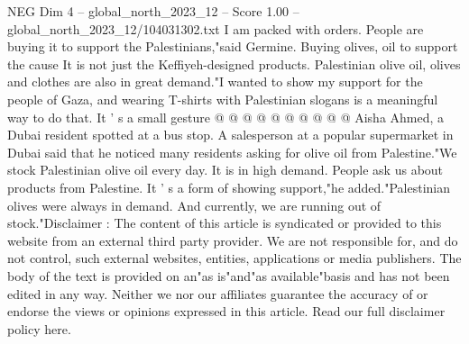 \begin{textsample}{NEG Dim 4 – global\_north\_2023\_12 – Score 1.00 – global\_north\_2023\_12/104031302.txt}
I am packed with orders.
People are buying it to support the Palestinians,"said Germine.
Buying olives, oil to support the cause It is not just the Keffiyeh-designed products.
Palestinian olive oil, olives and clothes are also in great demand."I wanted to show my support for the people of Gaza, and wearing T-shirts with Palestinian slogans is a meaningful way to do that.
It ' s a small gesture @ @ @ @ @ @ @ @ @ @ Aisha Ahmed, a Dubai resident spotted at a bus stop.
A salesperson at a popular supermarket in Dubai said that he noticed many residents asking for olive oil from Palestine."We stock Palestinian olive oil every day.
It is in high demand.
People ask us about products from Palestine.
It ' s a form of showing support,"he added."Palestinian olives were always in demand.
And currently, we are running out of stock."Disclaimer : The content of this article is syndicated or provided to this website from an external third party provider.
We are not responsible for, and do not control, such external websites, entities, applications or media publishers.
The body of the text is provided on an"as is"and"as available"basis and has not been edited in any way.
Neither we nor our affiliates guarantee the accuracy of or endorse the views or opinions expressed in this article.
Read our full disclaimer policy here.

\end{textsample}
